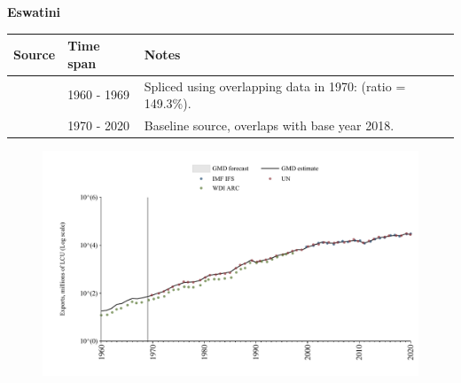 \documentclass[12pt,a4paper,landscape]{article}
\begin{document}
\begin{adjustbox}{max totalsize={\paperwidth}{\paperheight},center}
\begin{minipage}[t][\textheight][t]{\textwidth}
\vspace*{0.5cm}
{}
\begin{center}
{\Large\bfseries Eswatini}
\end{center}
\vspace{0.5cm}
\begin{table}[H]
\centering
\small
\begin{tabular}{|l|l|l|}
\hline
\textbf{Source} & \textbf{Time span} & \textbf{Notes} \\
\hline
\rowcolor{white}\cite{WDI_ARC}& 1960 - 1969 &Spliced using overlapping data in 1970: (ratio = 149.3\%).\\
\rowcolor{lightgray}\cite{UN}& 1970 - 2020 &Baseline source, overlaps with base year 2018.\\
\hline
\end{tabular}
\end{table}
\begin{figure}[H]
\centering
\includegraphics[width=\textwidth,height=0.6\textheight,keepaspectratio]{graphs/SWZ_exports.pdf}
\end{figure}
\end{minipage}
\end{adjustbox}
\end{document}
